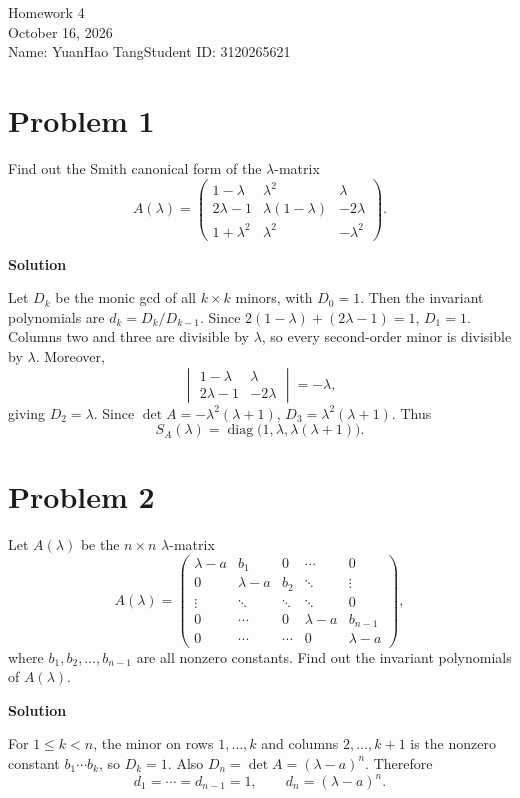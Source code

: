 \documentclass[UTF8,10pt,letterpaper,fontset=fandol]{ctexart}
\newcommand{\Solution}{\par\Needspace{4\baselineskip}\textbf{Solution}\par}
\begin{document}
\begin{center}
{\LARGE Homework 4}\\[0.6em]
October 16, 2026\\[0.25em]
Name: YuanHao Tang\quad Student ID: 3120265621
\end{center}

\section{Problem 1}
Find out the Smith canonical form of the $\lambda$-matrix
\[
A(\lambda)=\begin{pmatrix}
1-\lambda&\lambda^2&\lambda\\
2\lambda-1&\lambda(1-\lambda)&-2\lambda\\
1+\lambda^2&\lambda^2&-\lambda^2
\end{pmatrix}.
\]
\Solution
Let $D_k$ be the monic gcd of all $k\times k$ minors, with $D_0=1$. Then the invariant polynomials are $d_k=D_k/D_{k-1}$.
Since $2(1-\lambda)+(2\lambda-1)=1$, $D_1=1$. Columns two and three are divisible by $\lambda$, so every second-order minor is divisible by $\lambda$. Moreover,
\[
\begin{vmatrix}1-\lambda&\lambda\\2\lambda-1&-2\lambda\end{vmatrix}=-\lambda,
\]
giving $D_2=\lambda$. Since $\det A=-\lambda^2(\lambda+1)$, $D_3=\lambda^2(\lambda+1)$. Thus
\[
\boxed{S_A(\lambda)=\operatorname{diag}\bigl(1,\lambda,\lambda(\lambda+1)\bigr)}.
\]

\section{Problem 2}
Let $A(\lambda)$ be the $n\times n$ $\lambda$-matrix
\[
A(\lambda)=\begin{pmatrix}
\lambda-a&b_1&0&\cdots&0\\
0&\lambda-a&b_2&\ddots&\vdots\\
\vdots&\ddots&\ddots&\ddots&0\\
0&\cdots&0&\lambda-a&b_{n-1}\\
0&\cdots&\cdots&0&\lambda-a
\end{pmatrix},
\]
where $b_1,b_2,\ldots,b_{n-1}$ are all nonzero constants. Find out the invariant polynomials of $A(\lambda)$.
\Solution
For $1\le k<n$, the minor on rows $1,\ldots,k$ and columns $2,\ldots,k+1$ is the nonzero constant $b_1\cdots b_k$, so $D_k=1$.
Also $D_n=\det A=(\lambda-a)^n$. Therefore
\[
\boxed{d_1=\cdots=d_{n-1}=1,\qquad d_n=(\lambda-a)^n}.
\]
\end{document}
